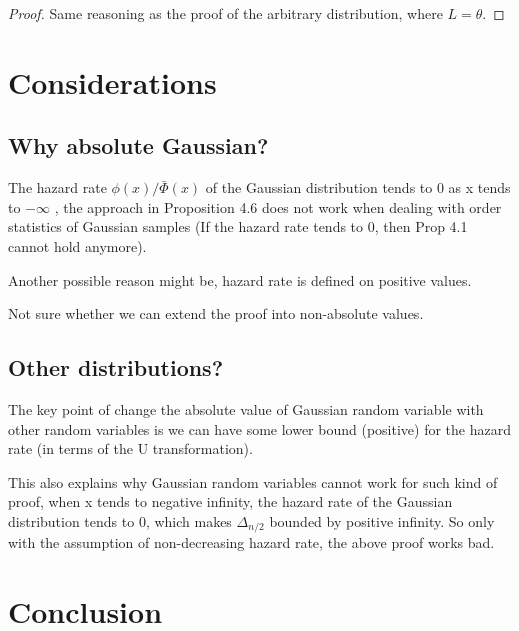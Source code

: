 \documentclass{article}
\theoremstyle{plain}
\begin{document}
\begin{proof}
Same reasoning as the proof of the arbitrary distribution, where $L =\theta$.
\end{proof}


\section{Considerations}

\subsection{Why absolute Gaussian?}

The hazard rate $\phi(x) / \bar{\Phi}(x)$ of the Gaussian distribution tends to 0 as x tends to $- \infty$ , the approach in  \cite{boucheron2012} Proposition 4.6 does not work when dealing with order statistics of Gaussian samples (If the hazard rate tends to 0, then Prop 4.1 cannot hold anymore).

Another possible reason might be, hazard rate is defined on positive values.

Not sure whether we can extend the proof into non-absolute values.


\subsection{Other distributions?}
The key point of change the absolute value of Gaussian random variable with other random variables is we can have some lower bound (positive) for the hazard rate (in terms of the U transformation).

This also explains why Gaussian random variables cannot work for such kind of proof, when x tends to negative infinity, the hazard rate of the Gaussian distribution tends to 0, which makes $\Delta_{n/2}$ bounded by positive infinity. So only with the assumption of non-decreasing hazard rate, the above proof works bad.


\section{Conclusion}
\end{document}
